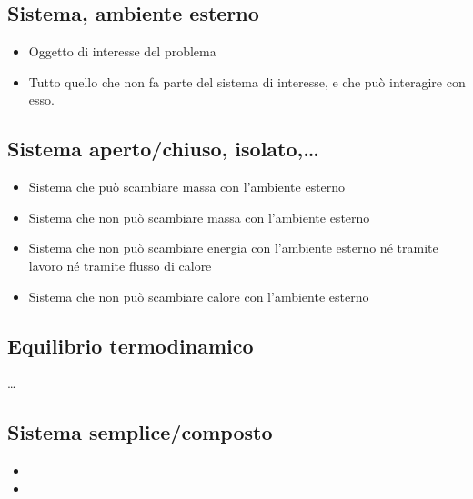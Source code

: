 \documentclass[letterpaper,10pt,italian]{jupyterBook}
\begin{document}
\subsection{Sistema, ambiente esterno}
\label{\detokenize{ch/thermodynamics/foundation-vocabulary:sistema-ambiente-esterno}}\begin{itemize}
\item {} 
\sphinxAtStartPar
{} Oggetto di interesse del problema

\item {} 
\sphinxAtStartPar
{} Tutto quello che non fa parte del sistema di interesse, e che può interagire con esso.

\end{itemize}


\subsection{Sistema aperto/chiuso, isolato,…}
\label{\detokenize{ch/thermodynamics/foundation-vocabulary:sistema-aperto-chiuso-isolato}}\begin{itemize}
\item {} 
\sphinxAtStartPar
{} Sistema che può scambiare massa con l’ambiente esterno

\item {} 
\sphinxAtStartPar
{} Sistema che non può scambiare massa con l’ambiente esterno

\item {} 
\sphinxAtStartPar
{} Sistema che non può scambiare energia con l’ambiente esterno né tramite lavoro né tramite flusso di calore

\item {} 
\sphinxAtStartPar
{} Sistema che non può scambiare calore con l’ambiente esterno

\end{itemize}


\subsection{Equilibrio termodinamico}
\label{\detokenize{ch/thermodynamics/foundation-vocabulary:equilibrio-termodinamico}}
\sphinxAtStartPar
…


\subsection{Sistema semplice/composto}
\label{\detokenize{ch/thermodynamics/foundation-vocabulary:sistema-semplice-composto}}\begin{itemize}
\item {} 
\sphinxAtStartPar
{}

\item {} 
\sphinxAtStartPar
{}

\end{itemize}
\end{document}
